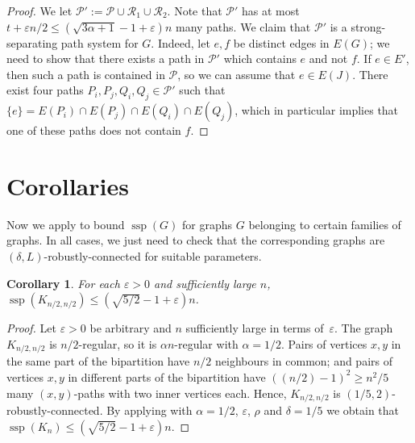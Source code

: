 \documentclass[a4paper, 11pt,reqno]{amsart}
\theoremstyle{plain}
\newtheorem{corollary}[theorem]{Corollary}
\theoremstyle{definition}
\numberwithin{equation}{section}
\DeclareMathOperator{\ssp}{ssp}
\newcommand{\eps}{\varepsilon}
\begin{document}
\begin{proof}
	We let $\mathcal{P}' := \mathcal{P} \cup \mathcal{R}_1 \cup
        \mathcal{R}_2$.  Note that $\mathcal{P}'$ has at most $t +
        \eps n/2 \leq (\sqrt{3 \alpha + 1} - 1 + \eps)n$ many paths.  We
        claim that $\mathcal{P}'$ is a strong-separating path system
        for $G$.  Indeed, let $e, f$ be distinct edges in $E(G)$; we
        need to show that there exists a path in $\mathcal{P}'$ which
        contains $e$ and not $f$.  If $e \in E'$, then such a path is
        contained in $\mathcal{P}$, so we can assume that $e \in
        E(J)$.  There exist four paths $P_i, P_j, Q_i, Q_j \in
        \mathcal{P}'$ such that $\{e\} = E(P_i) \cap E(P_j) \cap
        E(Q_i) \cap E(Q_j)$, which in particular implies that one of
        these paths does not contain $f$.
\end{proof}

\section{Corollaries} \label{sec:corollaries}

Now we apply  to bound $\ssp(G)$ for graphs $G$
belonging to certain families of graphs.  In all cases, we just need
to check that the corresponding graphs are $(\delta,
L)$-robustly-connected for suitable parameters.

\begin{corollary}
	For each $\eps > 0$ and sufficiently large $n$, $\ssp(K_{n/2, n/2}) \leq (\sqrt{5/2} - 1 + \eps)n$.
\end{corollary}

\begin{proof}
  Let $\eps > 0$ be arbitrary and $n$ sufficiently large in terms
  of~$\eps$.  The graph $K_{n/2, n/2}$ is $n/2$-regular, so it is
  $\alpha n$-regular with $\alpha = 1/2$.  Pairs of vertices $x,y$ in
  the same part of the bipartition have $n/2$ neighbours in common;
  and pairs of vertices $x,y$ in different parts of the bipartition
  have $((n/2)-1)^2 \geq n^2/5$ many $(x,y)$-paths with two inner
  vertices each.  Hence, $K_{n/2, n/2}$ is $(1/5,
  2)$-robustly-connected.  By applying  with
  $\alpha = 1/2$, $\eps$, $\rho$ and $\delta = 1/5$ we obtain that
  $\ssp(K_n) \leq (\sqrt{5/2} - 1 + \eps)n$.
\end{proof}
\end{document}
